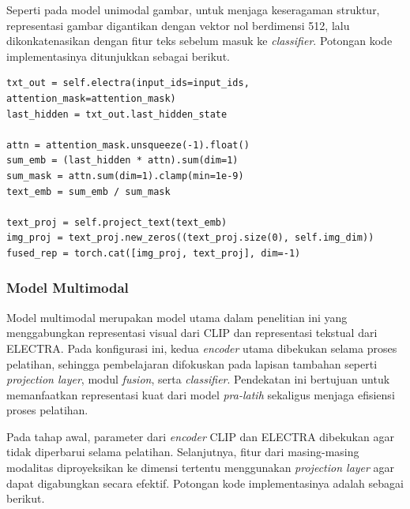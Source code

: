 Seperti pada model unimodal gambar, untuk menjaga keseragaman struktur, representasi gambar digantikan dengan vektor nol berdimensi 512, lalu dikonkatenasikan dengan fitur teks sebelum masuk ke \textit{classifier}. Potongan kode implementasinya ditunjukkan sebagai berikut.

\begin{lstlisting}[caption={Kode Implementasi Model Unimodal Teks}, label={code:4.unimodal_teks}]
txt_out = self.electra(input_ids=input_ids, attention_mask=attention_mask)
last_hidden = txt_out.last_hidden_state

attn = attention_mask.unsqueeze(-1).float()
sum_emb = (last_hidden * attn).sum(dim=1)
sum_mask = attn.sum(dim=1).clamp(min=1e-9)
text_emb = sum_emb / sum_mask

text_proj = self.project_text(text_emb)
img_proj = text_proj.new_zeros((text_proj.size(0), self.img_dim))
fused_rep = torch.cat([img_proj, text_proj], dim=-1)
\end{lstlisting}

\subsubsection{Model Multimodal}
\label{IV.Model.Konfigurasi.Multimodal}

Model multimodal merupakan model utama dalam penelitian ini yang menggabungkan representasi visual dari CLIP dan representasi tekstual dari ELECTRA. Pada konfigurasi ini, kedua \textit{encoder} utama dibekukan selama proses pelatihan, sehingga pembelajaran difokuskan pada lapisan tambahan seperti \textit{projection layer}, modul \textit{fusion}, serta \textit{classifier}. Pendekatan ini bertujuan untuk memanfaatkan representasi kuat dari model \textit{pra-latih} sekaligus menjaga efisiensi proses pelatihan.

Pada tahap awal, parameter dari \textit{encoder} CLIP dan ELECTRA dibekukan agar tidak diperbarui selama pelatihan. Selanjutnya, fitur dari masing-masing modalitas diproyeksikan ke dimensi tertentu menggunakan \textit{projection layer} agar dapat digabungkan secara efektif. Potongan kode implementasinya adalah sebagai berikut.

